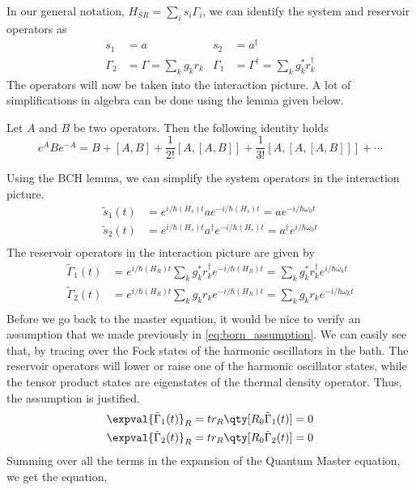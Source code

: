 \documentclass{scrartcl}
\newcommand{\1}{\mathbbm{1}}
\newcommand{\G}{\Gamma}
\newcommand{\iG}{\tilde{\Gamma}}
\newcommand{\is}{\tilde{s}}
\begin{document}
In our general notation, \(H_{SR} = \sum_i s_i \G_i\), we can identify the system and reservoir operators as
\begin{align}
	s_1 & = a & s_2 & = a^\dagger \\ \G_2 &= \G =  \sum_k g_k r_k & \G_1 &= \G^\dagger= \sum_k g_k^* r_k^\dagger
\end{align}
The operators will now be taken into the interaction picture. A lot of simplifications in algebra
can be done using the lemma given below.
\begin{lemma}
	Let \(A\) and \(B\) be two operators. Then the following identity holds
	\[ e^A B e^{-A} = B + [A,B] + \frac{1}{2!} [A,[A,B]] + \frac{1}{3!} [A,[A,[A,B]]] + \cdots \]
\end{lemma}
Using the BCH lemma, we can simplify the system operators in the interaction picture.
\begin{align*}
	\is_1(t) & = e^{i\slash \hbar (H_s)t} a e^{-i\slash \hbar (H_s)t} = a e^{-i\slash \hbar \omega_0 t}                \\
	\is_2(t) & = e^{i\slash \hbar (H_s)t} a^\dagger e^{-i\slash \hbar (H_s)t} = a^\dagger e^{i\slash \hbar \omega_0 t} \\
\end{align*}
The reservoir operators in the interaction picture are given by
\begin{align*}
	\iG_1(t) & = e^{i\slash \hbar (H_R)t} \sum_k g_k^* r_k^\dagger e^{-i\slash \hbar (H_R)t} = \sum_k g_k^* r_k^\dagger e^{i\slash \hbar \omega_k t} \\
	\iG_2(t) & = e^{i\slash \hbar (H_R)t} \sum_k g_k r_k e^{-i\slash \hbar (H_R)t} = \sum_k g_k r_k e^{-i\slash \hbar \omega_k t}                    \\
\end{align*}
Before we go back to the master equation, it would be nice to verify an assumption that we made previously
in \cref{eq:born_assumption}. We can easily see that, by tracing over the Fock states of the harmonic oscillators in the bath.
The reservoir operators will lower or raise one  of the harmonic oscillator states, while the tensor product states are eigenstates of the
thermal density operator. Thus, the assumption is justified.
\begin{align*}
	\expval{\iG_1(t)}_R & = tr_R\qty[R_0 \iG_1(t)] = 0 \\
	\expval{\iG_2(t)}_R & = tr_R\qty[R_0 \iG_2(t)] = 0
\end{align*}
Summing over all the terms in the expansion of the Quantum Master equation, we get the equation,
\end{document}
